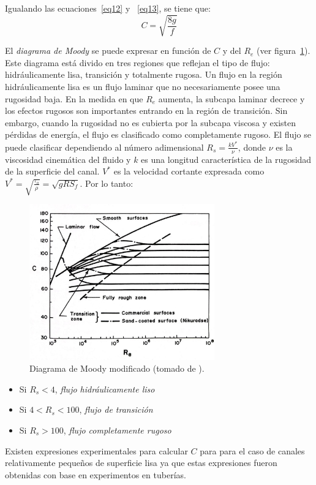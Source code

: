 \documentclass[11pt, oneside]{article}
\begin{document}
Igualando las ecuaciones~\ref{eq12} y ~\ref{eq13}, se tiene que:
\begin{equation}
C = \sqrt{\frac{8g}{f}}
\label{eq13}
\end{equation}

El \emph{diagrama de Moody} se puede expresar en funci\'on de $C$ y del $R_e$ (ver figura~\ref{fig3}). Este diagrama est\'a divido en tres regiones que reflejan el tipo de flujo: hidr\'aulicamente lisa, transici\'on y totalmente rugosa. Un flujo en la región hidráulicamente lisa es un flujo laminar que no necesariamente posee una rugosidad baja. En la medida en que $R_e$  aumenta, la subcapa laminar decrece y los efectos rugosos son importantes entrando en la región de transici\'on. Sin embargo, cuando la rugosidad no es cubierta por la subcapa viscosa y existen p\'erdidas de energ\'ia, el flujo es clasificado como completamente rugoso. El flujo se puede clasificar dependiendo  al n\'umero adimensional $R_s = \frac{k V^* }{\nu}$, donde $\nu$ es la viscosidad cinem\'atica del fluido y $k$ es una longitud característica de la rugosidad de la superficie del canal. $V^*$ es la velocidad cortante expresada como $V^* = \sqrt{\frac{\tau_o}{\rho}}=\sqrt{gR S_f}$. Por lo tanto:

\begin{figure}[h]
\centering
\includegraphics[width=8cm]{fig43.jpeg}
\caption{Diagrama de Moody modificado (tomado de \cite{Chau}).}
\label{fig3}
\end{figure}

\begin{itemize}
\item Si $R_s < 4$, \emph{flujo hidráulicamente liso}
\item Si $4 < R_s < 100$, \emph{flujo de transici\'on}
\item Si $R_s > 100$, \emph{flujo completamente rugoso} 
\end{itemize}
Existen expresiones experimentales para calcular $C$ para para el caso de canales relativamente pequeños de superficie lisa ya que estas expresiones fueron obtenidas con base en experimentos en tuber\'ias. 
\end{document}
